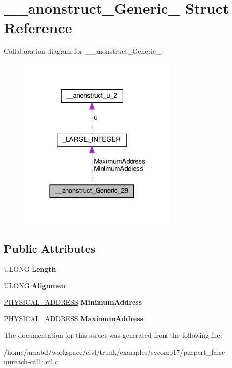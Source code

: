 \hypertarget{struct____anonstruct__Generic__29}{}\section{\+\_\+\+\_\+anonstruct\+\_\+\+Generic\+\_ Struct Reference}
\label{struct____anonstruct__Generic__29}


Collaboration diagram for \+\_\+\+\_\+anonstruct\+\_\+\+Generic\+\_\+:
\nopagebreak
\begin{figure}[H]
\begin{center}
\leavevmode
\includegraphics[width=226pt]{struct____anonstruct__Generic__29__coll__graph}
\end{center}
\end{figure}
\subsection*{Public Attributes}
\begin{DoxyCompactItemize}
\item 
\hypertarget{struct____anonstruct__Generic__29_a02d533137fccd21ac05a6d34aa0c148d}{}U\+L\+O\+N\+G {\bfseries Length}\label{struct____anonstruct__Generic__29_a02d533137fccd21ac05a6d34aa0c148d}

\item 
\hypertarget{struct____anonstruct__Generic__29_aa5b48047b985625cadb6bbe4c6a160b5}{}U\+L\+O\+N\+G {\bfseries Alignment}\label{struct____anonstruct__Generic__29_aa5b48047b985625cadb6bbe4c6a160b5}

\item 
\hypertarget{struct____anonstruct__Generic__29_a6db2384d1ed13d7f7aad3ae5f449bdc9}{}\hyperlink{union__LARGE__INTEGER}{P\+H\+Y\+S\+I\+C\+A\+L\+\_\+\+A\+D\+D\+R\+E\+S\+S} {\bfseries Minimum\+Address}\label{struct____anonstruct__Generic__29_a6db2384d1ed13d7f7aad3ae5f449bdc9}

\item 
\hypertarget{struct____anonstruct__Generic__29_aef60f6e862117f80d186338fc451bb93}{}\hyperlink{union__LARGE__INTEGER}{P\+H\+Y\+S\+I\+C\+A\+L\+\_\+\+A\+D\+D\+R\+E\+S\+S} {\bfseries Maximum\+Address}\label{struct____anonstruct__Generic__29_aef60f6e862117f80d186338fc451bb93}

\end{DoxyCompactItemize}


The documentation for this struct was generated from the following file\+:\begin{DoxyCompactItemize}
\item 
/home/arnabd/workspace/civl/trunk/examples/svcomp17/parport\+\_\+false-\/unreach-\/call.\+i.\+cil.\+c\end{DoxyCompactItemize}
